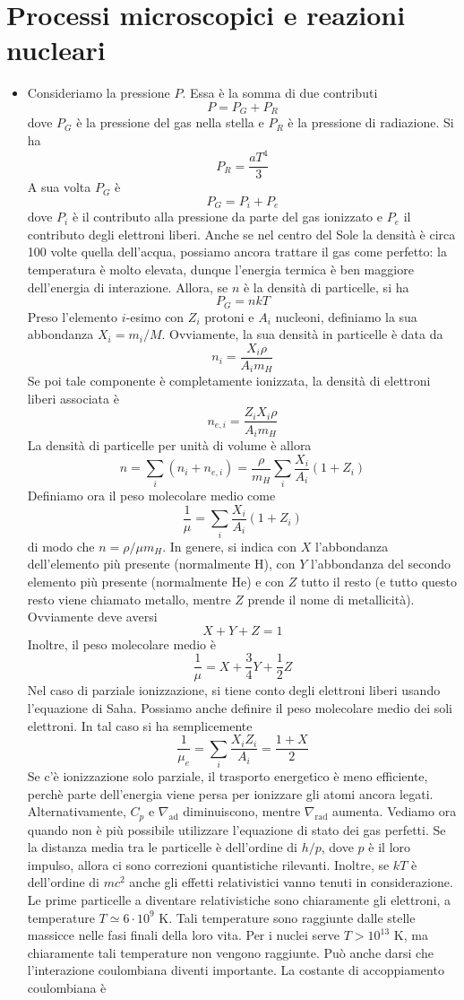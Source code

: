 \documentclass[a4paper,11pt]{article}
\let\oldnabla\nabla %
\renewcommand{\nabla}{\vec{\oldnabla}} %
\theoremstyle{theorem}
\theoremstyle{definition}
\begin{document}
	\section{Processi microscopici e reazioni nucleari}
	\begin{itemize}
		\item Consideriamo la pressione $P$. Essa è la somma di due contributi
		\[P=P_G+P_R\]
		dove $P_G$ è la pressione del gas nella stella e $P_R$ è la pressione di radiazione. Si ha
		\[P_R=\frac{aT^4}{3}\]
		A sua volta $P_G$ è
		\[P_G=P_i+P_e\]
		dove $P_i$ è il contributo alla pressione da parte del gas ionizzato e $P_e$ il contributo degli elettroni liberi. Anche se nel centro del Sole la densità è circa 100 volte quella dell'acqua, possiamo ancora trattare il gas come perfetto: la temperatura è molto elevata, dunque l'energia termica è ben maggiore dell'energia di interazione. Allora, se $n$ è la densità di particelle, si ha
		\[P_G=nkT\]
		Preso l'elemento $i$-esimo con $Z_i$ protoni e $A_i$ nucleoni, definiamo la sua abbondanza $X_i=m_i/M$. Ovviamente, la sua densità in particelle è data da
		\[n_i=\frac{X_i\rho}{A_im_H}\]
		Se poi tale componente è completamente ionizzata, la densità di elettroni liberi associata è
		\[n_{e,i}=\frac{Z_iX_i\rho}{A_im_H}\]
		La densità di particelle per unità di volume è allora
		\[n=\sum_{i}(n_i+n_{e,i})=\frac{\rho}{m_H}\sum_{i}\frac{X_i}{A_i}(1+Z_i)\]
		Definiamo ora il peso molecolare medio come
		\[\frac{1}{\mu}=\sum_{i}\frac{X_i}{A_i}(1+Z_i)\]
		di modo che $n=\rho/\mu m_H$. In genere, si indica con $X$ l'abbondanza dell'elemento più presente (normalmente H), con $Y$ l'abbondanza del secondo elemento più presente (normalmente He) e con $Z$ tutto il resto (e tutto questo resto viene chiamato metallo, mentre $Z$ prende il nome di metallicità). Ovviamente deve aversi
		\[X+Y+Z=1\]
		Inoltre, il peso molecolare medio è
		\[\frac{1}{\mu}=X+\frac{3}{4}Y+\frac{1}{2}Z\]
		Nel caso di parziale ionizzazione, si tiene conto degli elettroni liberi usando l'equazione di Saha. Possiamo anche definire il peso molecolare medio dei soli elettroni. In tal caso si ha semplicemente
		\[\frac{1}{\mu_e}=\sum_{i}\frac{X_iZ_i}{A_i}=\frac{1+X}{2}\]
		Se c'è ionizzazione solo parziale, il trasporto energetico è meno efficiente, perchè parte dell'energia viene persa per ionizzare gli atomi ancora legati. Alternativamente, $C_p$ e $\oldnabla_\textrm{ad}$ diminuiscono, mentre $\oldnabla_{\textrm{rad}}$ aumenta. Vediamo ora quando non è più possibile utilizzare l'equazione di stato dei gas perfetti. Se la distanza media tra le particelle è dell'ordine di $h/p$, dove $p$ è il loro impulso, allora ci sono correzioni quantistiche rilevanti. Inoltre, se $kT$ è dell'ordine di $mc^2$ anche gli effetti relativistici vanno tenuti in considerazione. Le prime particelle a diventare relativistiche sono chiaramente gli elettroni, a temperature $T\simeq 6\cdot10^9$ K. Tali temperature sono raggiunte dalle stelle massicce nelle fasi finali della loro vita. Per i nuclei serve $T>10^{13}$ K, ma chiaramente tali temperature non vengono raggiunte. Può anche darsi che l'interazione coulombiana diventi importante. La costante di accoppiamento coulombiana è

\end{itemize}
\end{document}
